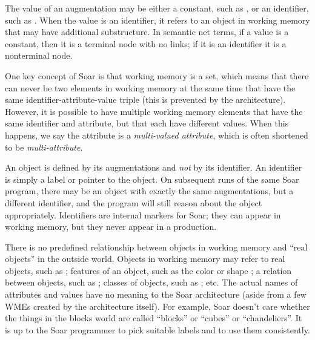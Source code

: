 The value of an augmentation may be either a constant, such as , or
an identifier, such as . When the value is an identifier, it refers
to an object in working memory that may have additional substructure. In
semantic net terms, if a value is a constant, then it is a terminal node with
no links; if it is an identifier it is a nonterminal node.

One key concept of Soar is that working memory is a set, which means that there can never be two elements in
working memory at the same time that have the same identifier-attribute-value
triple (this is prevented by the architecture). However, it is possible to have
multiple working memory elements that have the same identifier and attribute,
but that each have different values.  When this happens, we say the attribute
is a \emph{multi-valued attribute}, which is often shortened to be
\emph{multi-attribute}.

An object is defined by its augmentations and
\emph{not} by its identifier. An identifier is simply a label or pointer to the object. On subsequent runs of the same Soar program,
there may be an object with exactly the same augmentations, but a different
identifier, and the program will still reason about the object
appropriately. Identifiers are internal markers for Soar; they can appear
in working memory, but they never appear in a production.

There is no predefined relationship between objects in working memory and
``real objects'' in the outside world.  Objects in working memory may refer to
real objects, such as ; features of an object, such as the
color  or shape ; a relation between objects, such as ; classes of
objects, such as ; etc. The actual names of attributes and
values have no meaning to the Soar architecture (aside from a few WMEs
created by the architecture itself). For example, Soar doesn't care whether
the things in the blocks world are called ``blocks'' or ``cubes'' or
``chandeliers''. It is up to the Soar programmer to pick suitable labels and to
use them consistently.

